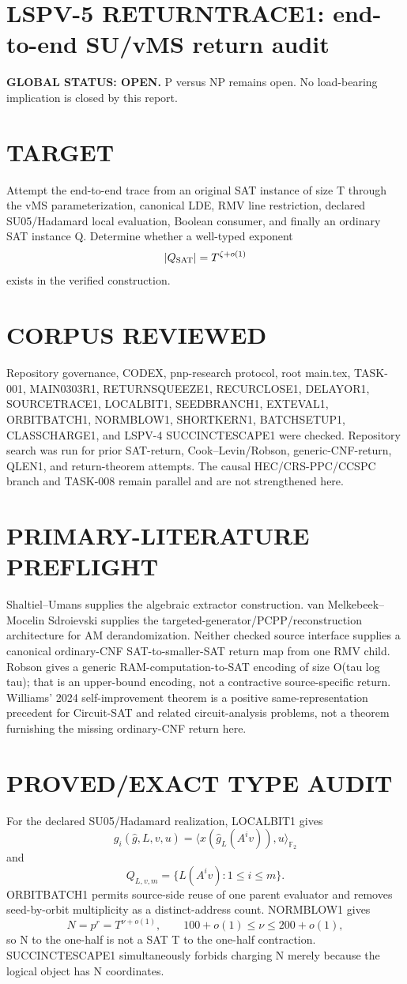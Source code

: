 \documentclass[11pt]{article}
\begin{document}
\section*{LSPV-5 RETURNTRACE1: end-to-end SU/vMS return audit}
\textbf{GLOBAL STATUS: OPEN.} P versus NP remains open. No load-bearing implication is closed by this report.

\section*{TARGET}
Attempt the end-to-end trace from an original SAT instance of size T through the vMS parameterization, canonical LDE, RMV line restriction, declared SU05/Hadamard local evaluation, Boolean consumer, and finally an ordinary SAT instance Q. Determine whether a well-typed exponent
\[
|Q_{\rm SAT}|=T^{\zeta+o(1)}
\]
exists in the verified construction.

\section*{CORPUS REVIEWED}
Repository governance, CODEX, pnp-research protocol, root main.tex, TASK-001, MAIN0303R1, RETURNSQUEEZE1, RECURCLOSE1, DELAYOR1, SOURCETRACE1, LOCALBIT1, SEEDBRANCH1, EXTEVAL1, ORBITBATCH1, NORMBLOW1, SHORTKERN1, BATCHSETUP1, CLASSCHARGE1, and LSPV-4 SUCCINCTESCAPE1 were checked. Repository search was run for prior SAT-return, Cook--Levin/Robson, generic-CNF-return, QLEN1, and return-theorem attempts. The causal HEC/CRS-PPC/CCSPC branch and TASK-008 remain parallel and are not strengthened here.

\section*{PRIMARY-LITERATURE PREFLIGHT}
Shaltiel--Umans supplies the algebraic extractor construction. van Melkebeek--Mocelin Sdroievski supplies the targeted-generator/PCPP/reconstruction architecture for AM derandomization. Neither checked source interface supplies a canonical ordinary-CNF SAT-to-smaller-SAT return map from one RMV child. Robson gives a generic RAM-computation-to-SAT encoding of size O(tau log tau); that is an upper-bound encoding, not a contractive source-specific return. Williams' 2024 self-improvement theorem is a positive same-representation precedent for Circuit-SAT and related circuit-analysis problems, not a theorem furnishing the missing ordinary-CNF return here.

\section*{PROVED/EXACT TYPE AUDIT}
For the declared SU05/Hadamard realization, LOCALBIT1 gives
\[
g_i(\widehat g,L,v,u)=\langle x(\widehat g_L(A^iv)),u\rangle_{\mathbb F_2}
\]
and
\[
Q_{L,v,m}=\{L(A^iv):1\le i\le m\}.
\]
ORBITBATCH1 permits source-side reuse of one parent evaluator and removes seed-by-orbit multiplicity as a distinct-address count. NORMBLOW1 gives
\[
N=p^r=T^{\nu+o(1)},\qquad100+o(1)\le\nu\le200+o(1),
\]
so N to the one-half is not a SAT T to the one-half contraction. SUCCINCTESCAPE1 simultaneously forbids charging N merely because the logical object has N coordinates.
\end{document}
